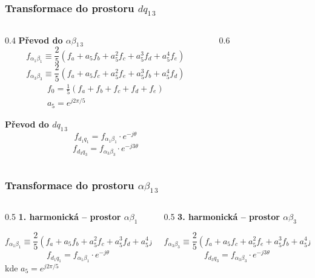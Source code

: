 \documentclass[%
  12pt,       				%
	t,                  %
	aspectratio=1610,   %
	unicode,						%
]{beamer}				    	%
\begin{document}
\begin{frame}
	\frametitle{Transformace do prostoru $dq_{1\,3}$}
	\begin{columns}
		\begin{column}{0.4\textwidth}
			\textbf{Převod do $\alpha \beta_{1\,3}$}
			\[	f_{\alpha_1 \beta_1 } \equiv \frac{2}{5} \left( f_{a} + a_5 f_{b} + a_5^2 f_{c} + a_5^3 f_{d} + a_5^4 f_{e} \right)
			\]
			\[	f_{\alpha_3 \beta_3 } \equiv \frac{2}{5} \left( f_{a} + a_5 f_{c} + a_5^2 f_{e} + a_5^3 f_{b} + a_5^4 f_{d} \right)
			\]
			\[  	\begin{gathered}
					f_0=\frac{1}{5}\left( f_a +f_b+f_c+f_d+f_e\right)\\
					a_5=e^{j2\pi/5}
			\end{gathered}
			\]

			\textbf{Převod do $d q_{1\,3}$}
			\[	f_{d_1 q_1}= f_{\alpha_1 \beta_1} \cdot e^{-j\theta}\]
			\[	f_{d_3 q_3}= f_{\alpha_3 \beta_3} \cdot e^{-j3\theta}\]
		\end{column}
		\begin{column}{0.6\textwidth}
			\begin{figure}
				\centering
				
			\end{figure}
		\end{column}
	\end{columns}
\end{frame}

\begin{frame}
	\frametitle{Transformace do prostoru $\alpha\beta_{1\,3}$}
	\begin{columns}
		\begin{column}{0.5\textwidth}
			\textbf{1. harmonická -- prostor $\alpha\beta_1$}
			\begin{figure}
				\centering
				\resizebox{!}{4cm }{
					}
				\end{figure}
				\[	f_{\alpha_1\beta_1} \equiv \frac{2}{5} \left( f_{a} + a_5 f_{b} + a_5^2 f_{c} + a_5^3 f_{d} + a_5^4 f_{e} \right)	\]
				\[	f_{d_1 q_1}= f_{\alpha_1 \beta_1} \cdot e^{-j\theta}\]
				kde $ a_5 = e^{j2\pi/5} $
		\end{column}
		\begin{column}{0.5\textwidth}
			\textbf{3. harmonická -- prostor $\alpha\beta_3$}
			\begin{figure}
				\centering
				\resizebox{!}{4cm }{
					
					}
			\end{figure}
			\[
				f_{\alpha_3\beta_3} \equiv \frac{2}{5} \left( f_{a} + a_5 f_{c} + a_5^2 f_{e} + a_5^3 f_{b} + a_5^4 f_{d} \right)
			\]
					\[	f_{d_3 q_3}= f_{\alpha_3 \beta_3} \cdot e^{-j3\theta}\]

		\end{column}
	\end{columns}
	
\end{frame}
\end{document}
